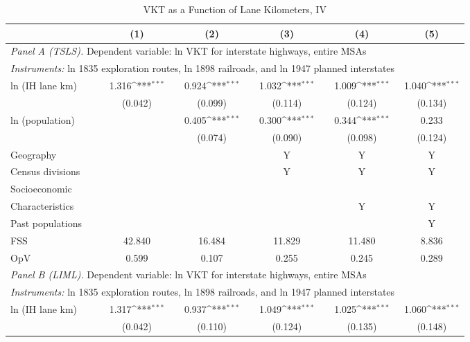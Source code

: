           \begin{table}[htbp]\centering         {}         \caption{VKT as a Function of Lane Kilometers, IV}         \begin{tabular}{l*{5}{c}}         \hline\hline         
                    &\multicolumn{1}{c}{(1)}         &\multicolumn{1}{c}{(2)}         &\multicolumn{1}{c}{(3)}         &\multicolumn{1}{c}{(4)}         &\multicolumn{1}{c}{(5)}         \\
 \hline \multicolumn{5}{l}{ \emph{Panel A (TSLS).} Dependent variable: ln VKT for interstate highways, entire MSAs} \\ 
 \multicolumn{5}{l}{ \emph{Instruments:} ln 1835 exploration routes, ln 1898 railroads, and ln 1947 planned interstates} \\
ln (IH lane km)     &       1.316\sym{***}&       0.924\sym{***}&       1.032\sym{***}&       1.009\sym{***}&       1.040\sym{***}\\
                    &     (0.042)         &     (0.099)         &     (0.114)         &     (0.124)         &     (0.134)         \\
[1em]
ln (population)     &                     &       0.405\sym{***}&       0.300\sym{***}&       0.344\sym{***}&       0.233         \\
                    &                     &     (0.074)         &     (0.090)         &     (0.098)         &     (0.124)         \\
           Geography & & & Y & Y & Y \\            Census divisions & & & Y & Y & Y \\            Socioeconomic           \\Characteristics & & & & Y & Y \\            Past populations & & & &  & Y \\            
FSS                 &      42.840         &      16.484         &      11.829         &      11.480         &       8.836         \\
OpV                 &       0.599         &       0.107         &       0.255         &       0.245         &       0.289         \\
 
          \hline         
 \multicolumn{5}{l}{ \emph{Panel B (LIML).} Dependent variable: ln VKT for interstate highways, entire MSAs} \\ 
 \multicolumn{5}{l}{ \emph{Instruments:} ln 1835 exploration routes, ln 1898 railroads, and ln 1947 planned interstates} \\
ln (IH lane km)     &       1.317\sym{***}&       0.937\sym{***}&       1.049\sym{***}&       1.025\sym{***}&       1.060\sym{***}\\
                    &     (0.042)         &     (0.110)         &     (0.124)         &     (0.135)         &     (0.148)         \\
 

\end{tabular}
\end{table}
